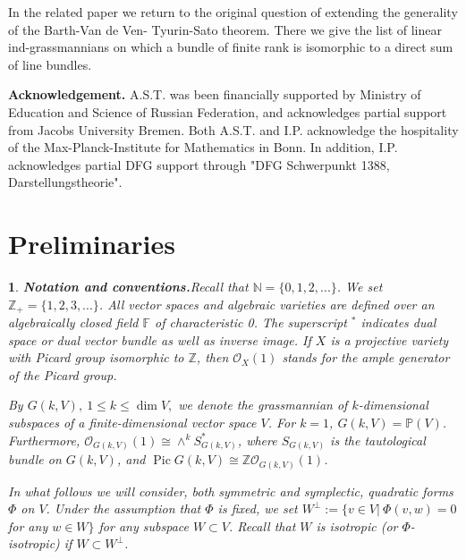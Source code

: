 \documentclass[12pt]{amsart}
\newcommand{\Pic}{\operatorname{Pic}\nolimits}
\newtheorem{sub}[subsection]{}
\theoremstyle{definition}
\begin{document}
In the related paper \cite{PT3} we return to the original question of extending the generality of the Barth-Van de Ven-
Tyurin-Sato theorem. There we give the list of linear ind-grassmannians on which a bundle of finite rank is isomorphic
to a direct sum of line bundles.

\textbf{Acknowledgement.} A.S.T. was been financially supported by Ministry of Education and Science
of Russian Federation, and acknowledges partial support from Jacobs University Bremen. Both A.S.T. and I.P.
acknowledge the hospitality of the Max-Planck-Institute for Mathematics in Bonn. In addition, I.P. acknowledges
partial DFG support through "DFG Schwerpunkt 1388, Darstellungstheorie".



\vspace{1cm}

\section{Preliminaries}\label{sec2}
\vspace{0.5cm}

\begin{sub}{\bf Notation and conventions.}\label{subsection 2.1}
\rm
Recall that $\mathbb{N}=\{0,1,2,...\}$. We set $\mathbb{Z}_+=\{1,2,3,...\}$. All vector spaces and algebraic varieties
are defined over an algebraically closed field $\mathbb{F}$ of characteristic 0.
The superscript ${}^*$ indicates dual space or dual vector bundle as well as inverse image. If $X$ is a projective
variety with Picard group isomorphic to $\mathbb{Z}$, then $\mathcal{O}_X(1)$ stands for the ample generator of the
Picard group.

By $G(k,V),\ 1\le k\le\dim V,$ we denote the grassmannian of $k$-dimensional subspaces of a finite-dimensional vector
space $V$. For $k=1$, $G(k,V)=\mathbb{P}(V)$. Furthermore, $\mathcal{O}_{G(k,V)}(1)\cong\wedge^kS_{G(k,V)}^*$, where
$S_{G(k,V)}$ is the tautological bundle on $G(k,V)$,  and $\Pic G(k,V)\cong\mathbb{Z}\mathcal{O}_{G(k,V)}(1)$.


In what follows we will consider, both symmetric and symplectic, quadratic forms $\Phi$ on $V$.
Under the assumption that $\Phi$ is fixed, we set $W^\bot:=\{v\in V|\ \Phi(v,w)=0$ for any
$w\in W\}$ for any subspace $W\subset V$. Recall
that $W$ is {\it isotropic} (or $\Phi$-\textit{isotropic}) if $W\subset W^\bot$.
\end{sub}
\end{document}
